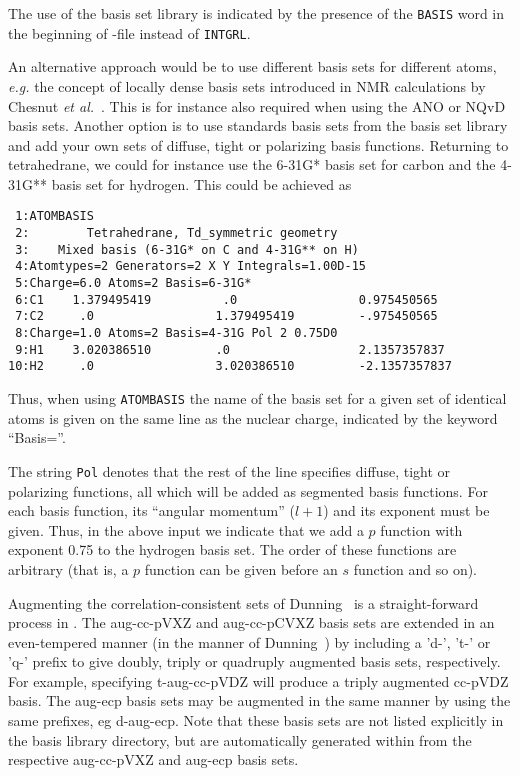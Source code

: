 The use of the basis set library is indicated by the presence of the
\verb|BASIS| word in the beginning of \mol-file instead of
\verb|INTGRL|.

An alternative approach would be to use different basis sets for
different atoms, {\it e.g.\/} the concept of locally
dense basis sets
introduced in NMR calculations by Chesnut {\it et
al.\/}~\cite{dbcberkdmdaejcc14}. This is for instance also required
when using the ANO or
NQvD
basis sets. Another option is to use
standards basis sets from the basis set 
library and add your own sets
of diffuse, tight or polarizing basis
functions. Returning to
tetrahedrane, we could for instance use the 6-31G* basis set for
carbon and the 4-31G** basis set for hydrogen. This could be achieved
as

\begin{verbatim}
 1:ATOMBASIS
 2:        Tetrahedrane, Td_symmetric geometry
 3:    Mixed basis (6-31G* on C and 4-31G** on H)
 4:Atomtypes=2 Generators=2 X Y Integrals=1.00D-15
 5:Charge=6.0 Atoms=2 Basis=6-31G*
 6:C1    1.379495419          .0                 0.975450565
 7:C2     .0                 1.379495419         -.975450565
 8:Charge=1.0 Atoms=2 Basis=4-31G Pol 2 0.75D0
 9:H1    3.020386510         .0                  2.1357357837
10:H2     .0                 3.020386510         -2.1357357837
\end{verbatim}


Thus, when using {\tt ATOMBASIS} the name of the
basis set for a given
set of identical atoms is given on the same line as the nuclear
charge, indicated by the keyword ``Basis=''.

The string {\tt Pol} denotes that the rest of the line specifies
diffuse, tight or polarizing
functions, all which will be added as segmented basis functions.
For each basis function, its ``angular momentum'' ($l+1$) and its
exponent must be given. Thus, in the above input we indicate that
we add a $p$ function with exponent 0.75 to the hydrogen basis
set. The order of these functions are arbitrary (that is, a $p$
function can be given before an $s$ function and so on).

Augmenting the correlation-consistent 
sets of Dunning~\cite{dewthdjcp100} is a straight-forward process in \dalton. 
The aug-cc-pVXZ and aug-cc-pCVXZ basis sets are extended in an even-tempered manner 
(in the manner of Dunning~\cite{dewthdjcp100})
by including a 'd-', 't-' or 'q-' prefix to give doubly, triply or quadruply 
augmented basis sets, respectively. For example, specifying t-aug-cc-pVDZ will
produce a triply augmented cc-pVDZ basis. The aug-ecp basis sets may be augmented 
in the same manner by using the same prefixes, eg d-aug-ecp. 
Note that these basis sets are not listed 
explicitly in the basis library directory, 
but are automatically generated within \dalton from the respective 
aug-cc-pVXZ and aug-ecp basis sets. 

